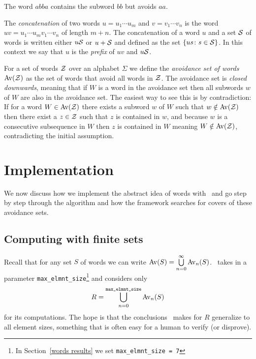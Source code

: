 \begin{example}
  The word $abba$ contains the subword $bb$ but avoids $aa$.
\end{example}

\begin{definition}
  The \emph{concatenation} of two words $u = u_1 \cdots u_m$ and $v = v_1 \cdots 
  v_n$ is the word $uv = u_1 \cdots u_m v_1 \cdots v_n$ of length $m + n$. The 
  concatenation of a word $u$ and a set ${\mathcal{S}}$ of words is written either 
  $u{\mathcal{S}}$ or $u + {\mathcal{S}}$ and defined as the set $\{ us \colon s \in 
  {\mathcal{S}}\}$. In this context we say that $u$ is the \emph{prefix} of $uv$ and 
  $u{\mathcal{S}}$.
\end{definition}

For a set of words ${\mathcal{Z}}$ over an alphabet $\Sigma$ we define the 
\emph{avoidance set of words} ${\mathrm{Av}\!\left({\mathcal{Z}}\right)}$ as the set of words that avoid all 
words in ${\mathcal{Z}}$. The avoidance set is \emph{closed downwards}, meaning that if 
$W$ is a word in the avoidance set then all subwords $w$ of $W$ are also in the 
avoidance set. The easiest way to see this is by contradiction: If for a word 
$W \in {\mathrm{Av}\!\left({\mathcal{Z}}\right)}$ there exists a subword $w$ of $W$ such that $w \notin 
{\mathrm{Av}\!\left({\mathcal{Z}}\right)}$ then there exist a $z \in {\mathcal{Z}}$ such that $z$ is contained in 
$w$, and because $w$ is a consecutive subsequence in $W$ then $z$ is contained 
in $W$ meaning $W \notin {\mathrm{Av}\!\left({\mathcal{Z}}\right)}$, contradicting the initial assumption.


\section{Implementation\label{words implementation}}

We now discuss how we implement the abstract idea of words with \CombCov\ and
go step by step through the algorithm and how the framework searches for covers of 
these avoidance sets.

\subsection{Computing with finite sets\label{computing with finite sets}}

Recall that for any set $S$ of words we can write ${\mathrm{Av}\!\left(S\right)} = 
\bigcup\limits_{n=0}^{\infty}{\mathrm{Av}_n\!\left(S\right)}$. \CombCov\ takes in a parameter 
\texttt{max\_elmnt\_size}\footnote{In Section~\ref{words results} we set 
\texttt{max\_elmnt\_size = 7}} and considers only \[ R = 
\bigcup\limits_{n=0}^{\texttt{max\_elmnt\_size}}{\mathrm{Av}_n\!\left(S\right)} \] for its computations. 
The hope is that the conclusions \CombCov\ makes for $R$ generalize to all 
element sizes, something that is often easy for a human to verify (or disprove).

